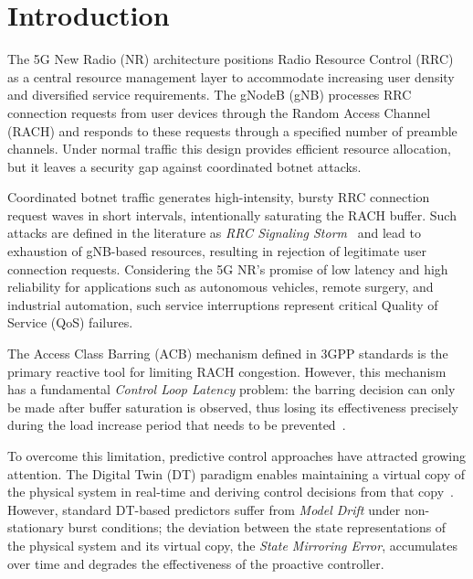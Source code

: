 \documentclass[conference]{IEEEtran}
\begin{document}
\section{Introduction}

The 5G New Radio (NR) architecture positions Radio Resource Control (RRC) as a central resource management layer to accommodate increasing user density and diversified service requirements. The gNodeB (gNB) processes RRC connection requests from user devices through the Random Access Channel (RACH) and responds to these requests through a specified number of preamble channels. Under normal traffic this design provides efficient resource allocation, but it leaves a security gap against coordinated botnet attacks.

Coordinated botnet traffic generates high-intensity, bursty RRC connection request waves in short intervals, intentionally saturating the RACH buffer. Such attacks are defined in the literature as \emph{RRC Signaling Storm}~\cite{b1} and lead to exhaustion of gNB-based resources, resulting in rejection of legitimate user connection requests. Considering the 5G NR's promise of low latency and high reliability for applications such as autonomous vehicles, remote surgery, and industrial automation, such service interruptions represent critical Quality of Service (QoS) failures.

The Access Class Barring (ACB) mechanism defined in 3GPP standards is the primary reactive tool for limiting RACH congestion. However, this mechanism has a fundamental \emph{Control Loop Latency} problem: the barring decision can only be made after buffer saturation is observed, thus losing its effectiveness precisely during the load increase period that needs to be prevented~\cite{b2}.

To overcome this limitation, predictive control approaches have attracted growing attention. The Digital Twin (DT) paradigm enables maintaining a virtual copy of the physical system in real-time and deriving control decisions from that copy~\cite{b3}. However, standard DT-based predictors suffer from \emph{Model Drift} under non-stationary burst conditions; the deviation between the state representations of the physical system and its virtual copy, the \emph{State Mirroring Error}, accumulates over time and degrades the effectiveness of the proactive controller.
\end{document}
